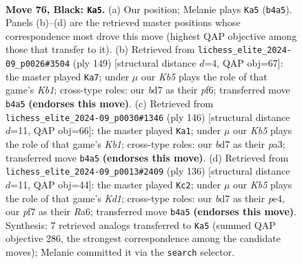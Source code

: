 \documentclass[11pt]{article}
\begin{document}
\clearpage

\begin{figure}[p]\centering
\begin{subfigure}{0.46\textwidth}\centering
\resizebox{\linewidth}{!}{%
\newchessgame
\chessboard[
  setfen={8/3B1P2/8/8/1k5R/8/5K1P/8 b - - 6 76},
  showmover=false,
  pgfstyle=straightmove, color=movearrow, markmove={b4-a5}
]}
\caption{}
\end{subfigure}\hfill
\begin{subfigure}{0.46\textwidth}\centering
\resizebox{\linewidth}{!}{%
\newchessgame
\chessboard[
  setfen={1k5R/8/2K2P2/8/7P/8/8/8 b - - 0 75},
  showmover=false,
  pgfstyle=straightmove, color=movearrow, markmove={b8-a7}
]}
\caption{}
\end{subfigure}
\\[4pt]
\begin{subfigure}{0.46\textwidth}\centering
\resizebox{\linewidth}{!}{%
\newchessgame
\chessboard[
  setfen={8/1r6/8/8/8/p5p1/6k1/1K6 w - - 1 74},
  showmover=false,
  pgfstyle=straightmove, color=movearrow, markmove={b1-a1}
]}
\caption{}
\end{subfigure}\hfill
\begin{subfigure}{0.46\textwidth}\centering
\resizebox{\linewidth}{!}{%
\newchessgame
\chessboard[
  setfen={8/8/R7/8/4p3/4k3/8/3K3r w - - 12 69},
  showmover=false,
  pgfstyle=straightmove, color=movearrow, markmove={d1-c2}
]}
\caption{}
\end{subfigure}
\caption{\textbf{Move 76, Black: \texttt{Ka5}.} (a) Our position; Melanie plays \texttt{Ka5} (\texttt{b4a5}). Panels (b)--(d) are the retrieved master positions whose correspondence most drove this move (highest QAP objective among those that transfer to it). (b) Retrieved from \texttt{lichess\_elite\_2024-09\_p0026\#3504} (ply 149) [structural distance $d$=4, QAP obj=67]: the master played \texttt{Ka7}; under $\mu$ our \emph{Kb5} plays the role of that game's \emph{Kb1}; cross-type roles: our \emph{b}d7 as their \emph{p}f6; transferred move \texttt{b4a5} \textbf{(endorses this move)}. (c) Retrieved from \texttt{lichess\_elite\_2024-09\_p0030\#1346} (ply 146) [structural distance $d$=11, QAP obj=66]: the master played \texttt{Ka1}; under $\mu$ our \emph{Kb5} plays the role of that game's \emph{Kb1}; cross-type roles: our \emph{b}d7 as their \emph{p}a3; transferred move \texttt{b4a5} \textbf{(endorses this move)}. (d) Retrieved from \texttt{lichess\_elite\_2024-09\_p0013\#2409} (ply 136) [structural distance $d$=11, QAP obj=44]: the master played \texttt{Kc2}; under $\mu$ our \emph{Kb5} plays the role of that game's \emph{Kd1}; cross-type roles: our \emph{b}d7 as their \emph{p}e4, our \emph{p}f7 as their \emph{R}a6; transferred move \texttt{b4a5} \textbf{(endorses this move)}. Synthesis: 7 retrieved analogs transferred to \texttt{Ka5} (summed QAP objective 286, the strongest correspondence among the candidate moves); Melanie committed it via the \texttt{search} selector.}
\label{fig:thought-m151}
\end{figure}
\end{document}

